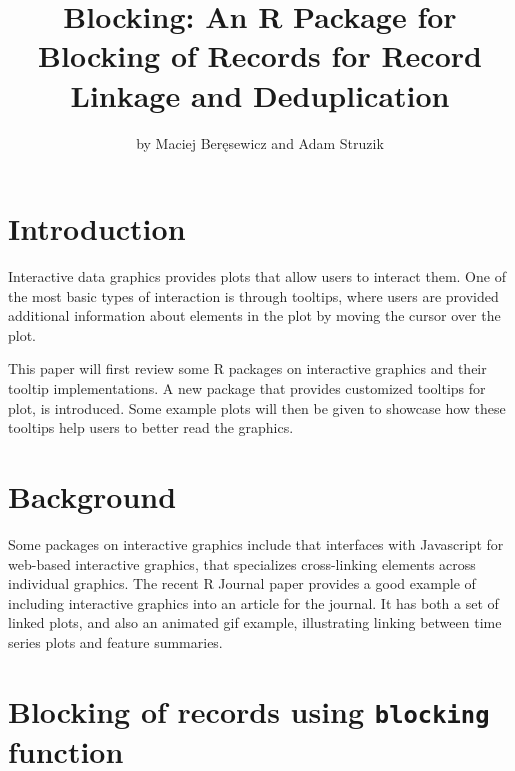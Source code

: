 \title{Blocking: An R Package for Blocking of Records for Record Linkage and Deduplication}


\author{by Maciej Beręsewicz and Adam Struzik}

\maketitle


\section{Introduction}\label{introduction}

Interactive data graphics provides plots that allow users to interact them. One of the most basic types of interaction is through tooltips, where users are provided additional information about elements in the plot by moving the cursor over the plot.

This paper will first review some R packages on interactive graphics and their tooltip implementations. A new package  that provides customized tooltips for plot, is introduced. Some example plots will then be given to showcase how these tooltips help users to better read the graphics.

\section{Background}\label{background}

Some packages on interactive graphics include  \citep{plotly} that interfaces with Javascript for web-based interactive graphics,  \citep{crosstalk} that specializes cross-linking elements across individual graphics. The recent R Journal paper  \citep{RJ-2021-050} provides a good example of including interactive graphics into an article for the journal. It has both a set of linked plots, and also an animated gif example, illustrating linking between time series plots and feature summaries.

\section{\texorpdfstring{Blocking of records using \texttt{blocking} function}{Blocking of records using blocking function}}\label{blocking-of-records-using-blocking-function}

